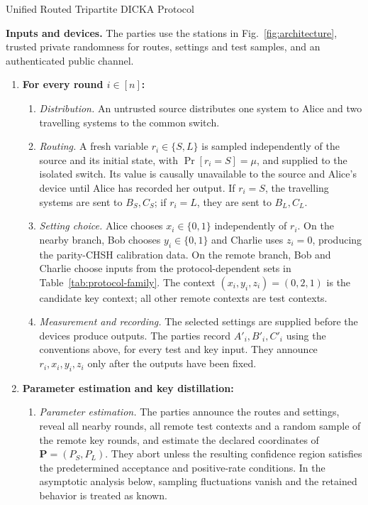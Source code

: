 \documentclass[aps,10pt,onecolumn,prx,superscriptaddress,longbibliography,nofootinbib]{revtex4-2}
\begin{document}
\begin{protocolbox}{Unified Routed Tripartite DICKA Protocol}
\label{prot:routed}

\textbf{Inputs and devices.}
The parties use the stations in Fig.~\ref{fig:architecture}, trusted private randomness for routes, settings and test samples, and an authenticated public channel.

\begin{enumerate}
\item \textbf{For every round \(i\in[n]\):}
\begin{enumerate}
  \item \textit{Distribution.}
  An untrusted source distributes one system to Alice and two travelling systems to the common switch.

  \item \textit{Routing.}
  A fresh variable \(r_i\in\{S,L\}\) is sampled independently of the source and its initial state, with \(\Pr[r_i=S]=\mu\), and supplied to the isolated switch. Its value is causally unavailable to the source and Alice's device until Alice has recorded her output. If \(r_i=S\), the travelling systems are sent to \(B_S,C_S\); if \(r_i=L\), they are sent to \(B_L,C_L\).

  \item \textit{Setting choice.}
  Alice chooses $x_i\in\{0,1\}$ independently of $r_i$. On the nearby branch, Bob chooses $y_i\in\{0,1\}$ and Charlie uses $z_i=0$, producing the parity-CHSH calibration data. On the remote branch, Bob and Charlie choose inputs from the protocol-dependent sets in Table~\ref{tab:protocol-family}. The context $(x_i,y_i,z_i)=(0,2,1)$ is the candidate key context; all other remote contexts are test contexts.

  \item \textit{Measurement and recording.}
  The selected settings are supplied before the devices produce outputs. The parties record \(A'_i,B'_i,C'_i\) using the conventions above, for every test and key input. They announce $r_i,x_i,y_i,z_i$ only after the outputs have been fixed.
\end{enumerate}

\item \textbf{Parameter estimation and key distillation:}
\begin{enumerate}
  \item \textit{Parameter estimation.}
  The parties announce the routes and settings, reveal all nearby rounds, all remote test contexts and a random sample of the remote key rounds, and estimate the declared coordinates of \(\mathbf P=(P_S,P_L)\). They abort unless the resulting confidence region satisfies the predetermined acceptance and positive-rate conditions. In the asymptotic analysis below, sampling fluctuations vanish and the retained behavior is treated as known.


\end{enumerate}
\end{enumerate}
\end{protocolbox}
\end{document}
